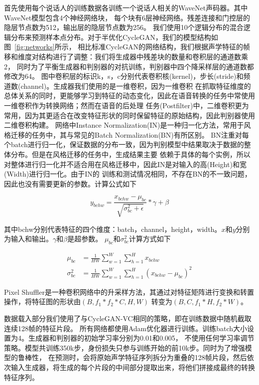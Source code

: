 首先使用每个说话人的训练数据各训练一个说话人相关的WaveNet声码器。其中WaveNet模型包含4个神经网络块，
每个块有6层神经网络。残差连接和门控层的隐层节点数为512，输出层的隐层节点数为256。
我们使用10个逻辑分布的混合逻辑分布来预测样本点分布。对于半优化CycleGAN，我们的模型结构如图~\ref{fig:networks}所示，
相比标准CycleGAN的网络结构，我们根据声学特征的帧移和维度对结构进行了调整：我们将生成器中残差块的数量和卷积层的通道数乘2，
同时为了平衡生成器和判别器的对抗训练，判别器中四个降采样层的通道数都修改为64。
图中卷积层的标识k，s，c分别代表卷积核(kernel)，步长(stride)和频道数(channel)。生成器我们使用的是一维卷积，因为一维卷积
在抓取特征维度的总体关系的同时，更能够学习到特征的动态变化，因此在语音转换的任务中常使用一维卷积作为转换网络；然而在语音的后处理
任务(Postfilter)中，二维卷积更为常用，因为其更适合在改变特征形状的同时保留特征的原始结构，因此判别器使用二维卷积构建。
网络中Instance Normalization(IN)是一种归一化方法，常用于风格迁移的任务中，其与常见的Batch Normalization(BN)有所区别。
BN注重对每个batch进行归一化，保证数据的分布一致，因为判别模型中结果取决于数据的整体分布。但是在风格迁移的任务中，生成结果主要
依赖于具体的每个实例，所以对整体进行归一化并不适合用在风格迁移中，因此IN是对输入的高(Height)和宽(Width)进行归一化。由于IN的
训练和测试情况相同，不存在BN的不一致问题，因此也没有需要更新的参数。计算公式如下

\begin{equation}
    y_{bchw} = \frac{x_{bchw}-\mu_{bc}}{\sqrt{\sigma^2_{bc}+\epsilon}} * \gamma + \beta
\end{equation}

其中bchw分别代表特征的四个维度：batch，channel，height，width。$x$和$y$分别为输入和输出。$\gamma$和$\beta$是超参数。
$\mu_{bc}$和$\sigma^2_{bc}$计算方式如下

\begin{align}
    \mu_{bc} & = \frac{1}{HW}\sum^W_{w=1}\sum^H_{h=1}x_{bchw} \\
    \sigma^2_{bc} & = \frac{1}{HW}\sum^W_{w=1}\sum^H_{h=1}(x_{bchw}-\mu_{bc})^2
\end{align}

Pixel Shuffler是一种卷积网络中的升采样方法，其通过对特征矩阵进行变换和转置操作，将特征图的形状由$(B,f_1 * f_2 * C,H,W)$
转变为$(B,C,f_1 *H,f_2 *W)$。

数据载入部分我们使用了与CycleGAN-VC相同的策略，即在训练数据中随机截取连续128帧的特征片段。
所有网络都使用Adam优化器进行训练。训练batch大小设置为4。生成器和判别器的初始学习率分别为0.01和0.005，
不使用任何学习率调节策略。模型共训练350k步，身份损失只参与训练开始的前10k步。同时为了增强模型的鲁棒性，
在预测时，会将原始声学特征序列拆分为重叠的128帧片段，然后依次输入生成器，将生成的每个片段的中间部分提取出来，将他们拼接成最终的转换特征序列。

